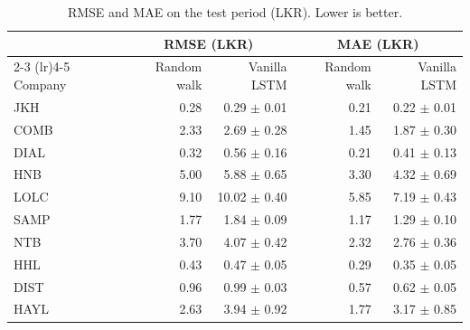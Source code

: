 \documentclass[11pt,a4paper]{article}
\begin{document}
\begin{table}[H]
  \centering
  \caption{RMSE and MAE on the test period (LKR). Lower is better.}
  \label{tab:results_lkr}
  \begin{tabular}{lrrrr}
    \toprule
            & \multicolumn{2}{c}{RMSE (LKR)} & \multicolumn{2}{c}{MAE (LKR)} \\
    \cmidrule(lr){2-3} \cmidrule(lr){4-5}
    Company & Random walk & Vanilla LSTM & Random walk & Vanilla LSTM \\
    \midrule
    JKH  & 0.28 & 0.29 $\pm$ 0.01  & 0.21 & 0.22 $\pm$ 0.01 \\
    COMB & 2.33 & 2.69 $\pm$ 0.28  & 1.45 & 1.87 $\pm$ 0.30 \\
    DIAL & 0.32 & 0.56 $\pm$ 0.16  & 0.21 & 0.41 $\pm$ 0.13 \\
    HNB  & 5.00 & 5.88 $\pm$ 0.65  & 3.30 & 4.32 $\pm$ 0.69 \\
    LOLC & 9.10 & 10.02 $\pm$ 0.40 & 5.85 & 7.19 $\pm$ 0.43 \\
    SAMP & 1.77 & 1.84 $\pm$ 0.09  & 1.17 & 1.29 $\pm$ 0.10 \\
    NTB  & 3.70 & 4.07 $\pm$ 0.42  & 2.32 & 2.76 $\pm$ 0.36 \\
    HHL  & 0.43 & 0.47 $\pm$ 0.05  & 0.29 & 0.35 $\pm$ 0.05 \\
    DIST & 0.96 & 0.99 $\pm$ 0.03  & 0.57 & 0.62 $\pm$ 0.05 \\
    HAYL & 2.63 & 3.94 $\pm$ 0.92  & 1.77 & 3.17 $\pm$ 0.85 \\
    \bottomrule
  \end{tabular}
\end{table}
\end{document}
